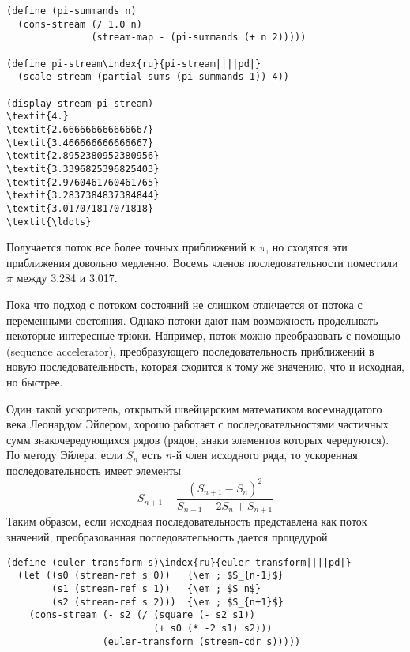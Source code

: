 \begin{Verbatim}[fontsize=\small]
(define (pi-summands n)
  (cons-stream (/ 1.0 n)
               (stream-map - (pi-summands (+ n 2)))))

(define pi-stream\index{ru}{pi-stream||||pd|}
  (scale-stream (partial-sums (pi-summands 1)) 4))

(display-stream pi-stream)
\textit{4.}
\textit{2.666666666666667}
\textit{3.466666666666667}
\textit{2.8952380952380956}
\textit{3.3396825396825403}
\textit{2.9760461760461765}
\textit{3.2837384837384844}
\textit{3.017071817071818}
\textit{\ldots}
\end{Verbatim}
Получается поток все более точных приближений к $\pi$, но
сходятся эти приближения довольно медленно.  Восемь членов
последовательности поместили $\pi$ между 3.284 и 3.017.

Пока что подход с потоком состояний не слишком отличается
от потока с переменными состояния.  Однако потоки дают нам возможность
проделывать некоторые интересные трюки.  Например, поток можно
преобразовать с помощью
 (sequence accelerator), преобразующего последовательность
приближений в новую последовательность, которая сходится к тому же
значению, что и исходная, но быстрее.

Один такой ускоритель, открытый швейцарским
математиком восемнадцатого века
Леонардом Эйлером, хорошо работает с
последовательностями частичных сумм знакочередующихся рядов (рядов,
знаки элементов которых чередуются).  По методу Эйлера, если
$S_n$ есть $n$-й член исходного ряда, то
ускоренная последовательность имеет элементы
$$
S_{n+1} - \frac{(S_{n+1} - S_n)^2}
               {S_{n-1} - 2S_n + S_{n+1}}
$$
Таким образом, если исходная последовательность представлена как
поток значений, преобразованная последовательность дается процедурой

\begin{Verbatim}[fontsize=\small]
(define (euler-transform s)\index{ru}{euler-transform||||pd|}
  (let ((s0 (stream-ref s 0))   {\em ; $S_{n-1}$}
        (s1 (stream-ref s 1))   {\em ; $S_n$}
        (s2 (stream-ref s 2)))  {\em ; $S_{n+1}$}
    (cons-stream (- s2 (/ (square (- s2 s1))
                          (+ s0 (* -2 s1) s2)))
                 (euler-transform (stream-cdr s)))))
\end{Verbatim}

